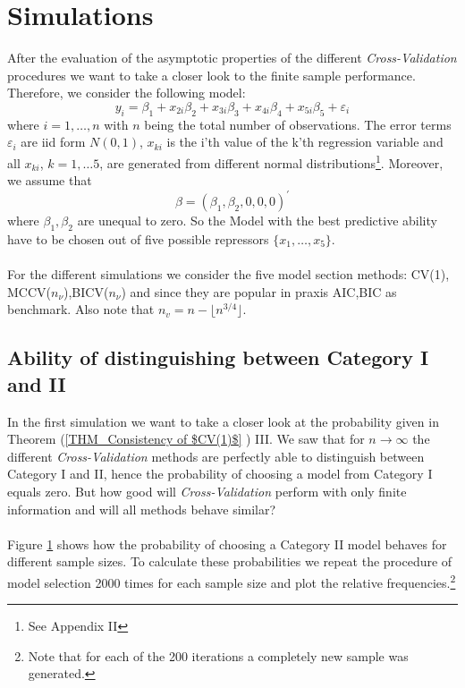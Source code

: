 \documentclass[Research_Module_ES.tex]{subfiles}
\begin{document}
\section{Simulations}
\label{Simulation1}
After the evaluation of the asymptotic properties of the different \textit{Cross-Validation} procedures we want to take a closer look to the finite sample performance. Therefore, we consider the following model:
\[
	y_i=\beta_1+x_{2i}\beta_2+x_{3i}\beta_3+x_{4i}\beta_4+x_{5i}\beta_5+\varepsilon_i
\]
where $i=1,\ldots,n$ with $n$ being the total number of observations. The error terms $\varepsilon_i$ are iid form $N(0,1)$,  $x_{ki}$ is the i'th value of the k'th regression variable and all $x_{ki}$, $k=1,\ldots5$, are generated from different normal distributions\footnote{See Appendix II}. Moreover, we assume that
\[
	\beta=(\beta_1,\beta_2,0,0,0)^\prime
\]
where $\beta_1,\beta_2$ are unequal to zero. So the Model with the best predictive ability have to be chosen out of five possible repressors $\{x_1,\ldots,x_5\}$. \\
\\
For the different simulations we consider the five model section methods: CV(1), MCCV($n_\nu$),BICV($n_\nu$) and since they are popular in praxis AIC,BIC as benchmark. Also note that $n_v=n-\lfloor n^{3/4}\rfloor$.

\subsection{Ability of distinguishing between Category I and II }
In the first simulation we want to take a closer look at the probability given in Theorem (\ref{THM_Consistency of $CV(1)$} ) III. We saw that for $n\to\infty$ the different \textit{Cross-Validation} methods are perfectly able to distinguish between Category I and II, hence the probability of choosing a model from Category I equals zero. But how good will \textit{Cross-Validation} perform with only finite information and will all methods behave similar?\\
\\
Figure \ref{Simulation1} shows how the probability of choosing a Category II model behaves for different sample sizes. To calculate these probabilities we repeat the procedure of model selection 2000 times for each sample size and plot the relative frequencies.\footnote{Note that for each of the 200 iterations a completely new sample was generated.}
\end{document}
